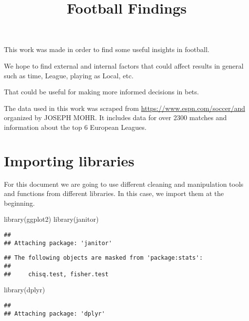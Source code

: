 \documentclass[
]{article}
\title{Football Findings}
\author{}
\date{\vspace{-2.5em}}
\newenvironment{Shaded}{\begin{snugshade}}{\end{snugshade}}
\newcommand{\FunctionTok}[1]{\textcolor[rgb]{0.00,0.00,0.00}{#1}}
\newcommand{\NormalTok}[1]{#1}
\begin{document}
\maketitle

This work was made in order to find some useful insights in football.

We hope to find external and internal factors that could affect results
in general such as time, League, playing as Local, etc.

That could be useful for making more informed decisions in bets.

The data used in this work was scraped from
\url{https://www.espn.com/soccer/and} organized by JOSEPH MOHR. It
includes data for over 2300 matches and information about the top 6
European Leagues.

\hypertarget{importing-libraries}{%
\section{Importing libraries}\label{importing-libraries}}

For this document we are going to use different cleaning and
manipulation tools and functions from different libraries. In this case,
we import them at the beginning.

\begin{Shaded}
\begin{Highlighting}[]
\FunctionTok{library}\NormalTok{(ggplot2)}
\FunctionTok{library}\NormalTok{(janitor)}
\end{Highlighting}
\end{Shaded}

\begin{verbatim}
## 
## Attaching package: 'janitor'
\end{verbatim}

\begin{verbatim}
## The following objects are masked from 'package:stats':
## 
##     chisq.test, fisher.test
\end{verbatim}

\begin{Shaded}
\begin{Highlighting}[]
\FunctionTok{library}\NormalTok{(dplyr)}
\end{Highlighting}
\end{Shaded}

\begin{verbatim}
## 
## Attaching package: 'dplyr'
\end{verbatim}
\end{document}
